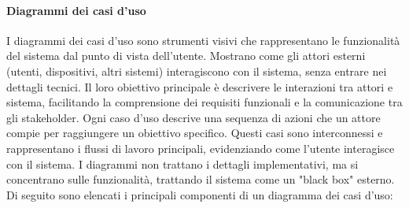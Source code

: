 \paragraph{Diagrammi dei casi d'uso} I diagrammi dei casi d'uso sono strumenti visivi che rappresentano le funzionalità del sistema dal punto di vista dell'utente. Mostrano come gli attori esterni (utenti, dispositivi, altri sistemi) interagiscono con il sistema, senza entrare nei dettagli tecnici. Il loro obiettivo principale è descrivere le interazioni tra attori e sistema, facilitando la comprensione dei requisiti funzionali e la comunicazione tra gli stakeholder. Ogni caso d'uso descrive una sequenza di azioni che un attore compie per raggiungere un obiettivo specifico. Questi casi sono interconnessi e rappresentano i flussi di lavoro principali, evidenziando come l'utente interagisce con il sistema. I diagrammi non trattano i dettagli implementativi, ma si concentrano sulle funzionalità, trattando il sistema come un "black box" esterno.\\
\medskip Di seguito sono elencati i principali componenti di un diagramma dei casi d’uso:

